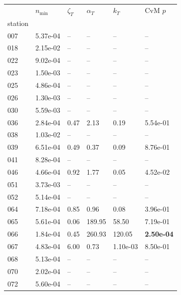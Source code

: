\begin{figure}[htbp!]
    \centering
    {\footnotesize
    \begin{minipage}[t]{0.48\linewidth}
        \centering
        \begin{tabular}{llllll}
        \toprule
         & $n_{\min}$ & $\zeta_T$ & $\alpha_T$ & $k_T$ & CvM $p$ \\
        station &  &  &  &  &  \\
        \midrule
                    007 & 5.37e-04 & -- & -- & -- & --\\
                    018 & 2.15e-02 & -- & -- & -- & --\\
                    022 & 9.02e-04 & -- & -- & -- & --\\
                    023 & 1.50e-03 & -- & -- & -- & --\\
                    025 & 4.86e-04 & -- & -- & -- & --\\
                    026 & 1.30e-03 & -- & -- & -- & --\\
                    030 & 5.59e-03 & -- & -- & -- & --\\
                    036 & 2.84e-04 & 0.47 & 2.13 & 0.19 & 5.54e-01\\
                    038 & 1.03e-02 & -- & -- & -- & --\\
                    039 & 6.51e-04 & 0.49 & 0.37 & 0.09 & 8.76e-01\\
                    041 & 8.28e-04 & -- & -- & -- & --\\
                    046 & 4.66e-04 & 0.92 & 1.77 & 0.05 & 4.52e-02\\
                    051 & 3.73e-03 & -- & -- & -- & --\\
                    052 & 5.14e-04 & -- & -- & -- & --\\
                    064 & 7.18e-04 & 0.85 & 0.96 & 0.08 & 3.96e-01\\
                    065 & 5.61e-04 & 0.06 & 189.95 & 58.50 & 7.19e-01\\
                    066 & 1.84e-04 & 0.45 & 260.93 & 120.05 & \textbf{2.50e-04}\\
                    067 & 4.83e-04 & 6.00 & 0.73 & 1.10e-03 & 8.50e-01\\
                    068 & 5.13e-04 & -- & -- & -- & --\\
                    070 & 2.02e-04 & -- & -- & -- & --\\
                    072 & 5.60e-04 & -- & -- & -- & --\\

\end{tabular}
\end{minipage}}
\end{figure}
